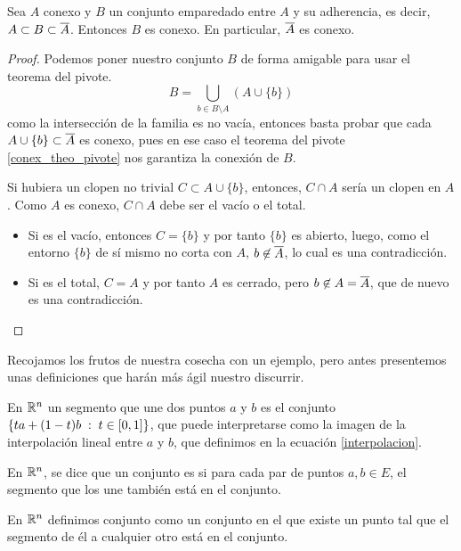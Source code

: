\begin{theo}[Sandwich]\label{conex_teo_adherencia_conexa}
	Sea $A$ conexo y $B$ un conjunto emparedado entre $A$ y su adherencia, es decir, $A\subset B\subset\overline{A}$. Entonces $B$ es conexo. En particular, $\overline{A}$ es conexo.
\end{theo}
\begin{proof}
	Podemos poner nuestro conjunto $B$ de forma amigable para usar el teorema del pivote.
	\[B=\bigcup_{b\in B\setminus A} (A\cup\{b\}) \]
	como la intersección de la familia es no vacía, entonces basta probar que cada $A\cup\{b\}\subset\overline{A}$ es conexo, pues en ese caso el teorema del pivote \ref{conex_theo_pivote} nos garantiza la conexión de $B$.
	
	Si hubiera un clopen no trivial $C\subset A\cup\{b\}$, entonces, $C\cap A$ sería un clopen en $A$. Como $A$ es conexo, $C\cap A$ debe ser el vacío o el total.
	\begin{itemize}
		\item Si es el vacío, entonces $C=\{b\}$ y por tanto $\{b\}$ es abierto, luego, como el entorno $\{b\}$ de sí mismo no corta con $A$, $b\not\in\overline{A}$, lo cual es una contradicción.
		\item Si es el total, $C=A$ y por tanto $A$ es cerrado, pero $b\not\in A=\overline{A}$, que de nuevo es una contradicción. \qedhere
	\end{itemize}
\end{proof}

Recojamos los frutos de nuestra cosecha con un ejemplo, pero antes presentemos unas definiciones que harán más ágil nuestro discurrir.
\begin{defi}[Segmento]
	En $\mathbb{R}^n$ un segmento que une dos puntos $a$ y $b$ es el conjunto $\{ta+(1-t)b\;:\; t\in[0,1]\}$, que puede interpretarse como la imagen de la interpolación lineal entre $a$ y $b$, que definimos en la ecuación \eqref{interpolacion}.
\end{defi}
\begin{defi}[Convexo]
	En $\mathbb{R}^n$, se dice que un conjunto es  si para cada par de puntos $a,b\in E$, el segmento que los une también está en el conjunto.
\end{defi}
\begin{defi}[Estrellado]
	En $\mathbb{R}^n$ definimos conjunto  como un conjunto en el que existe un punto tal que el segmento de él a cualquier otro está en el conjunto.
\end{defi}

